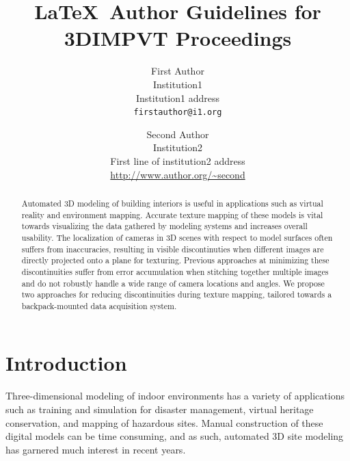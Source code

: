 \documentclass[10pt,twocolumn,letterpaper]{article}
\begin{document}
\title{\LaTeX\ Author Guidelines for 3DIMPVT Proceedings}

\author{First Author\\
  Institution1\\
  Institution1 address\\
  {\tt\small firstauthor@i1.org}
  \and
  Second Author\\
  Institution2\\
  First line of institution2 address\\
  {\small\url{http://www.author.org/~second}} }

\maketitle

\begin{abstract}
  Automated 3D modeling of building interiors is useful in applications
  such as virtual reality and environment mapping. Accurate texture
  mapping of these models is vital towards visualizing the data
  gathered by modeling systems and increases overall usability. The
  localization of cameras in 3D scenes with respect to model surfaces
  often suffers from inaccuracies, resulting in visible discontinuties
  when different images are directly projected onto a plane for
  texturing. Previous approaches at minimizing these discontinuities
  suffer from error accumulation when stitching together multiple
  images and do not robustly handle a wide range of camera locations
  and angles. We propose two approaches for reducing discontinuities
  during texture mapping, tailored towards a backpack-mounted data
  acquisition system.
\end{abstract}

\section{Introduction}
Three-dimensional modeling of indoor environments has a variety of
applications such as training and simulation for disaster management,
virtual heritage conservation, and mapping of hazardous sites. Manual
construction of these digital models can be time consuming, and as
such, automated 3D site modeling has garnered much interest in recent
years.
\end{document}
